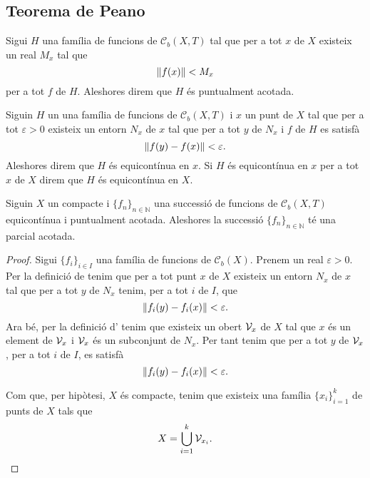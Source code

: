 \documentclass[../Apunts.tex]{subfiles}
\begin{document}
	\subsection{Teorema de Peano}
	\begin{definition}
		\label{def:família de funcions puntualment acotada}
		Sigui \(H\) una família de funcions de \(\mathcal{C}_{b}(X,T)\) tal que per a tot \(x\) de \(X\) existeix un real \(M_{x}\) tal que
		\[\norm{f(x)}<M_{x}\]
		per a tot \(f\) de \(H\). Aleshores direm que \(H\) és puntualment acotada.
	\end{definition}
	\begin{definition}
		\label{def:família de funcions equicontínua en un punt}
		\label{def:família de funcions equicontínua}
		Siguin \(H\) un una família de funcions de \(\mathcal{C}_{b}(X,T)\) i \(x\) un punt de \(X\) tal que per a tot \(\varepsilon>0\) existeix un entorn \(N_{x}\) de \(x\) tal que per a tot \(y\) de \(N_{x}\) i \(f\) de \(H\) es satisfà
		\[\norm{f(y)-f(x)}<\varepsilon.\]
		Aleshores direm que \(H\) és equicontínua en \(x\). Si \(H\) és equicontínua en \(x\) per a tot \(x\) de \(X\) direm que \(H\) és equicontínua en \(X\).
	\end{definition}
	\begin{theorem}
		\label{thm:Teorema de Arzelà-Ascoli}
		Siguin \(X\) un compacte i \(\{f_{n}\}_{n\in\mathbb{N}}\) una successió de funcions de \(\mathcal{C}_{b}(X,T)\) equicontínua i puntualment acotada. Aleshores la successió \(\{f_{n}\}_{n\in\mathbb{N}}\) té una parcial acotada.
		\begin{proof}
			Sigui \(\{f_{i}\}_{i\in I}\) una  família de funcions de \(\mathcal{C}_{b}(X)\). Prenem un real \(\varepsilon>0\). Per la definició de  tenim que per a tot punt \(x\) de \(X\) existeix un entorn \(N_{x}\) de \(x\) tal que per a tot \(y\) de \(N_{x}\) tenim, per a tot \(i\) de \(I\), que
			\[\norm{f_{i}(y)-f_{i}(x)}<\varepsilon.\]
			Ara bé, per la definició d' tenim que existeix un obert \(\mathcal{V}_{x}\) de \(X\) tal que \(x\) és un element de \(\mathcal{V}_{x}\) i \(\mathcal{V}_{x}\) és un subconjunt de \(N_{x}\). Per tant tenim que per a tot \(y\) de \(\mathcal{V}_{x}\), per a tot \(i\) de \(I\), es satisfà
			\[\norm{f_{i}(y)-f_{i}(x)}<\varepsilon.\]
			
			Com que, per hipòtesi, \(X\) és compacte, tenim que existeix una família \(\{x_{i}\}_{i=1}^{k}\) de punts de \(X\) tals que
			\[X=\bigcup_{i=1}^{k}\mathcal{V}_{x_{i}}.\]
			
			
		\end{proof}
	\end{theorem}
\end{document}
